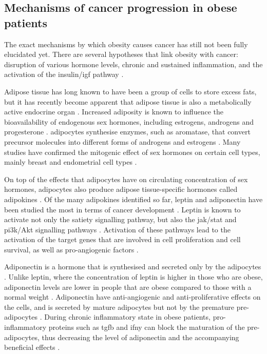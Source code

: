 \subsection{Mechanisms of cancer progression in obese patients}
\label{sub:mechanisms_of_cancer_progression_in_obese_patient}

The exact mechanisms by which obesity causes cancer has still not been fully elucidated yet.
There are several hypotheses that link obesity with cancer: disruption of various hormone levels, chronic and sustained inflammation, and the activation of the insulin/\gls{igf} pathway \citep{Lumeng2011,Roberts2010}.

Adipose tissue has long known to have been a group of cells to store excess fats, but it has recently become apparent that adipose tissue is also a metabolically active endocrine organ \citep{Roberts2010}.
Increased adiposity is known to influence the bioavailability of endogenous sex hormones, including estrogens, androgens and progesterone \citep{Calle2004}.
\Glspl{adipocyte} synthesise enzymes, such as aromatase, that convert precursor molecules into different forms of androgens and estrogens \citep{Calle2004}.
Many studies have confirmed the mitogenic effect of sex hormones on certain cell types, mainly breast and endometrial cell types \citep{Roberts2010}.

On top of the effects that \glspl{adipocyte} have on circulating concentration of sex hormones, \glspl{adipocyte} also produce adipose tissue-specific hormones called adipokines \citep{Roberts2010}.
Of the many adipokines identified so far, leptin and adipo\-nectin have been studied the most in terms of cancer development \citep{Renehan2006,Roberts2010}.
Leptin is known to activate not only the satiety signalling pathway, but also the \gls{jak}/\gls{stat} and \gls{pi3k}/Akt signalling pathways \citep{Garofalo2006,Renehan2006}.
Activation of these pathways lead to the activation of the target genes that are involved in cell proliferation and cell survival, as well as pro-angiogenic factors \citep{Garofalo2006}.

Adiponectin is a hormone that is synthesised and secreted only by the \glspl{adipocyte} \citep{Kelesidis2006}.
Unlike leptin, where the concentration of leptin is higher in those who are obese, adiponectin levels are lower in people that are obese compared to those with a normal weight \citep{Kelesidis2006,Renehan2006}.
Adiponectin have anti-angiogenic and anti-proliferative effects on the cells, and is secreted by mature \glspl{adipocyte} but not by the premature pre-adipocytes \citep{Gilbert2013}.
During chronic inflammatory state in obese patients, pro-inflammatory proteins such as \gls{tgfb} and \gls{ifny} can block the maturation of the pre-adipocytes, thus decreasing the level of adiponectin and the accompanying beneficial effects \citep{Gilbert2013}.

